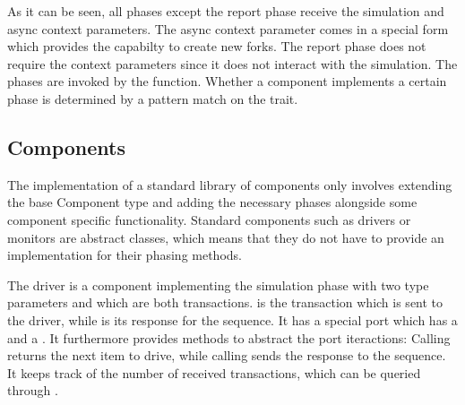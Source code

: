 As it can be seen, all phases except the report phase receive the simulation and async context parameters. The async
context parameter comes in a special form  which provides the capabilty to create new forks. The
report phase does not require the context parameters since it does not interact with the simulation. The phases are
invoked by the  function. Whether a component implements a certain phase is determined by a pattern
match on the trait.

\subsection{Components} %

The implementation of a standard library of components only involves extending the base Component type and adding the
necessary phases alongside some component specific functionality. Standard components such as drivers or monitors are
abstract classes, which means that they do not have to provide an implementation for their phasing methods.

The driver is a component implementing the simulation phase with two type parameters  and  which are
both transactions.  is the transaction which is sent to the driver, while  is its response for the
sequence. It has a special port  which has a  and a . It
furthermore provides methods to abstract the port iteractions: Calling  returns the next item to drive,
while calling  sends the response to the sequence. It keeps track of the number of received
transactions, which can be queried through .

